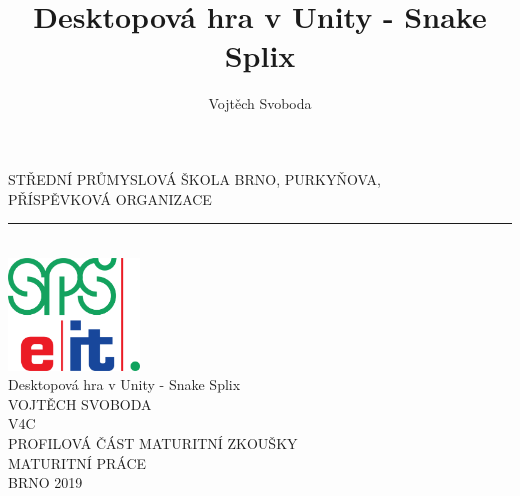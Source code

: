 \documentclass[12pt,a4paper]{report}
\title{Desktopová hra v Unity - Snake Splix}
\author{Vojtěch Svoboda}
\date{}
\begin{document}

\begin{titlepage}
{\sffamily\bfseries
    \begin{center}
        {\large STŘEDNÍ PRŮMYSLOVÁ ŠKOLA BRNO, PURKYŇOVA,\\\vspace{2mm}
        PŘÍSPĚVKOVÁ ORGANIZACE}\\
        \noindent\rule{\linewidth}{0.4pt}\\
        \vspace{3cm}
        \includegraphics[width=3.5cm]{images/spseit.png}\\
        \vspace{3cm}
        {\fontsize{24}{28}\selectfont Desktopová hra v Unity - Snake Splix}\\
        \vspace{2cm}
        {\fontsize{16}{20}\selectfont VOJTĚCH SVOBODA}\\
        \vspace{1cm}
        {\fontsize{16}{20}\selectfont V4C}\\
        \vspace{3cm}
        {\fontsize{16}{20}\selectfont PROFILOVÁ ČÁST MATURITNÍ ZKOUŠKY\\\vspace{2mm}
        MATURITNÍ PRÁCE}\\
        \vfill
        {\fontsize{16}{20}\selectfont BRNO 2019}\\
    \end{center}
}
\end{titlepage}

\newpage
\setcounter{page}{2}
\end{document}
